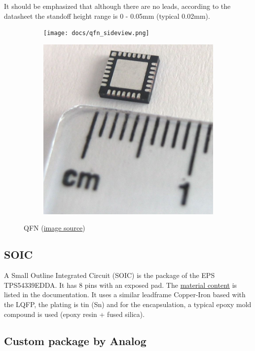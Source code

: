 \documentclass[final]{cubedoc}
\begin{document}
	It should be emphasized that although there are no leads, according to the datasheet the standoff height range is 0 - 0.05mm (typical 0.02mm).
	
	\begin{figure}[h!]
		\centering
		\begin{subfigure}{.5\textwidth}
			\centering
			\texttt{[image: docs/qfn\_sideview.png]}
			\caption{}
			\label{fig:sub1}
		\end{subfigure}%
		\begin{subfigure}{.5\textwidth}
			\centering
			\includegraphics[keepaspectratio, width=0.5\linewidth, height=.3\textheight]{docs/qfn_real.jpg}
			\caption{}
			\label{fig:sub2}
		\end{subfigure}
		\caption{QFN \small{(\href{https://web.archive.org/web/20200818153946/https://en.wikipedia.org/wiki/Flat_no-leads_package}{image source})}}
		\label{fig:test}
	\end{figure}
	
	
	
	\subsection{SOIC}
	
	A Small Outline Integrated Circuit (SOIC) is the package of the EPS TPS54339EDDA. It has 8 pins with an exposed pad. The  \href{https://web.archive.org/web/20200818133800/https://www.ti.com/materialcontent/en/report?pcid=263544&opn=TPS54339EDDA}{material content} is listed in the documentation. It uses a similar leadframe Copper-Iron based with the LQFP, the plating is tin (Sn) and for the encapsulation, a typical epoxy mold compound is used (epoxy resin + fused silica). 
	
	
	
	\subsection{Custom package by Analog}
	
\end{document}
